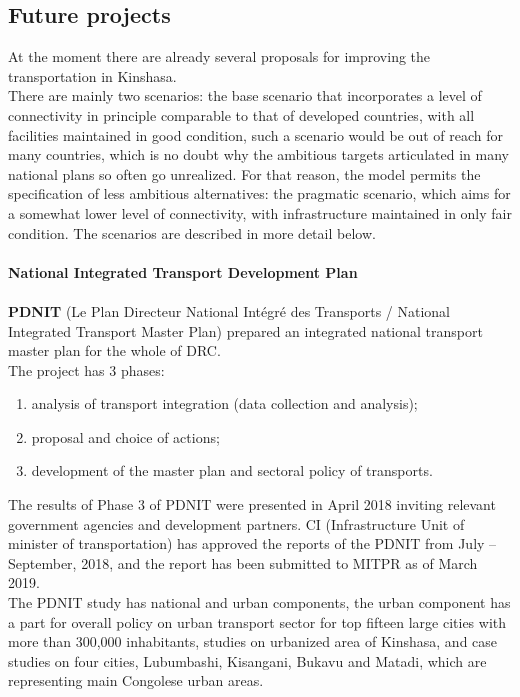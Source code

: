 \documentclass{article}
\begin{document}
\subsection{Future projects}
At the moment there are already several proposals for improving the transportation in Kinshasa.\\
There are mainly two scenarios: the base scenario that incorporates a level of connectivity in principle comparable to that of developed countries, with all facilities maintained in good condition, such a scenario would be out of reach for many countries, which is no doubt why the ambitious targets articulated in many national plans so often go unrealized. For that reason, the model permits the specification of less ambitious alternatives: the pragmatic scenario, which aims for a somewhat lower level of connectivity, with infrastructure maintained in only fair condition. The scenarios are described in more detail below.\\
\\
\textbf{National Integrated Transport Development Plan}\\
\\
\textbf{PDNIT} (Le Plan Directeur National Intégré des Transports / National Integrated Transport Master 
Plan) prepared an integrated national transport master plan for the whole of DRC.\\
The project has 3 phases:
\begin{enumerate}
\item analysis of transport integration (data collection and analysis); 
\item proposal and choice of actions;
\item development of the master plan and sectoral policy of transports. 
\end{enumerate}
The results of Phase 3 of PDNIT were presented in April 2018 inviting relevant government agencies and development partners. CI (Infrastructure Unit of minister of transportation) has approved the reports of the PDNIT from July – September, 2018, and the report has been submitted to MITPR as of March 2019. \\
The PDNIT study has national and urban components, the urban component has a part for overall  
policy on urban transport sector for top fifteen large cities with more than 300,000 inhabitants, 
studies on urbanized area of Kinshasa, and case studies on four cities, Lubumbashi, Kisangani, 
Bukavu and Matadi, which are representing main Congolese urban areas. \\
\end{document}

